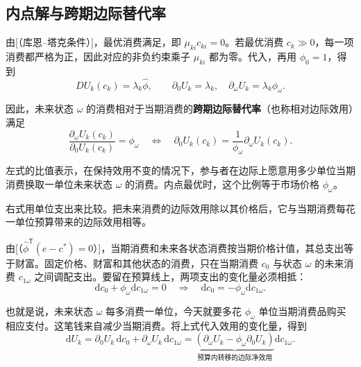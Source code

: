 \subsection{内点解与跨期边际替代率}
\begin{tcolorbox}[knowledge,title=内点最优与跨期边际替代率]
由[（库恩--塔克条件）]，最优消费满足，即 $\mu_{ki}c_{ki}=0$。若最优消费 $c_k\gg0$，每一项消费都严格为正，因此对应的非负约束乘子 $\mu_{ki}$ 都为零。代入，再用 $\phi_0=1$，得到
\begin{equation}
 DU_k(c_k)=\lambda_k\hat\phi,\qquad
 \partial_0U_k=\lambda_k,\quad\partial_\omega U_k=\lambda_k\phi_\omega.\label{eq:wj-three-interior}
\end{equation}

因此，未来状态 $\omega$ 的消费相对于当期消费的\textbf{跨期边际替代率}（也称相对边际效用）满足
\begin{equation}
 \frac{\partial_\omega U_k(c_k)}{\partial_0U_k(c_k)}=\phi_\omega
 \quad\Longleftrightarrow\quad
 \partial_0U_k(c_k)=\frac1{\phi_\omega}\partial_\omega U_k(c_k).\label{eq:wj-three-mrs}
\end{equation}

左式的比值表示，在保持效用不变的情况下，参与者在边际上愿意用多少单位当期消费换取一单位未来状态 $\omega$ 的消费。内点最优时，这个比例等于市场价格 $\phi_\omega$。

右式用单位支出来比较。把未来消费的边际效用除以其价格后，它与当期消费每花一单位预算带来的边际效用相等。
\end{tcolorbox}

由[（$\hat\phi^{\mathsf T}(e-c^*)=0$）]，当期消费和未来各状态消费按当期价格计值，其总支出等于财富。固定价格、财富和其他状态的消费，只在当期消费 $c_0$ 与状态 $\omega$ 的未来消费 $c_{1\omega}$ 之间调配支出。要留在预算线上，两项支出的变化量必须相抵：
\[
 \mathrm dc_0+\phi_\omega\mathrm dc_{1\omega}=0
 \quad\Longrightarrow\quad
 \mathrm dc_0=-\phi_\omega\mathrm dc_{1\omega}.
\]

也就是说，未来状态 $\omega$ 每多消费一单位，今天就要多花 $\phi_\omega$ 单位当期消费品购买相应支付。这笔钱来自减少当期消费。将上式代入效用的变化量，得到
\[
 \mathrm dU_k=\partial_0U_k\,\mathrm dc_0+\partial_\omega U_k\,\mathrm dc_{1\omega}
 =
 \underbrace{(\partial_\omega U_k-\phi_\omega\partial_0U_k)}_{\text{预算内转移的边际净效用}}
 \mathrm dc_{1\omega}.
\]

